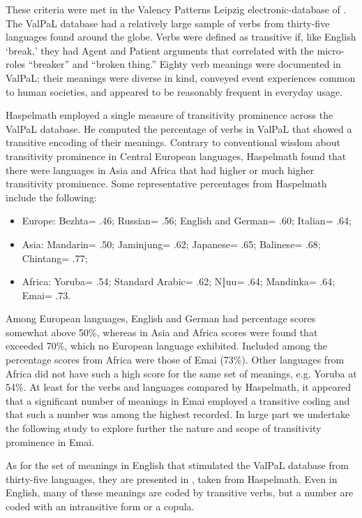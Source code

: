 \documentclass[output=paper,colorlinks,citecolor=brown
]{langscibook}
\begin{document}
These criteria were met in the Valency Patterns Leipzig electronic-database of \citet{HartmannHaspelmathTaylor2013}. The ValPaL database had a relatively large sample of verbs from thirty-five languages found around the globe. Verbs were defined as transitive if, like English ‘break,’ they had Agent and Patient arguments that correlated with the micro-roles “breaker” and “broken thing.” Eighty verb meanings were documented in ValPaL; their meanings were diverse in kind, conveyed event experiences common to human societies, and appeared to be reasonably frequent in everyday usage.   

Haspelmath employed a single measure of transitivity prominence across the ValPaL database. He computed the percentage of verbs in ValPaL that showed a transitive encoding of their meanings. Contrary to conventional wisdom about transitivity prominence in Central European languages, Haspelmath found that there were languages in Asia and Africa that had higher or much higher transitivity prominence. Some representative percentages from Haspelmath include the following: 

 \begin{itemize}
        \item Europe: Bezhta= .46; Russian= .56; English and German= .60; Italian= .64;
        \item Asia: Mandarin= .50; Jaminjung= .62; Japanese= .65; Balinese= .68; Chintang= .77;  
        \item Africa: Yoruba= .54; Standard Arabic= .62; N‖uu= .64; Mandinka= .64; Emai= .73. 
\end{itemize}

Among European languages, English and German had percentage scores somewhat above 50\%, whereas in Asia and Africa scores were found that exceeded 70\%, which no European language exhibited. Included among the percentage scores from Africa were those of Emai (73\%). Other languages from Africa did not have such a high score for the same set of meanings, e.g. Yoruba at 54\%. At least for the verbs and languages compared by Haspelmath, it appeared that a significant number of meanings in Emai employed a transitive coding and that such a number was among the highest recorded. In large part we undertake the following study to explore further the nature and scope of transitivity prominence in Emai.  

As for the set of meanings in English that stimulated the ValPaL database from thirty-five languages, they are presented in , taken from Haspelmath. Even in English, many of these meanings are coded by transitive verbs, but a number are coded with an intransitive form or a copula.  
\end{document}
